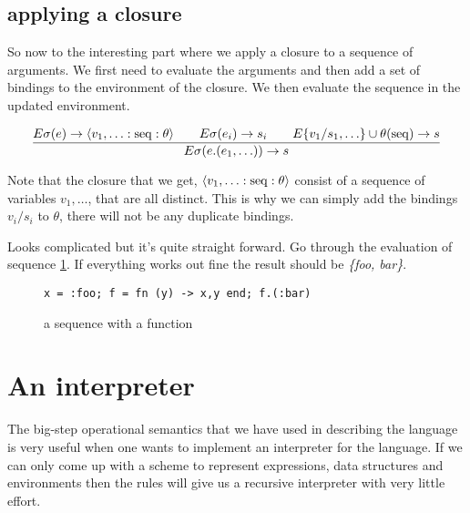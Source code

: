 \documentclass[a4paper,11pt]{article}
\begin{document}
\subsection{applying a closure}

So now to the interesting part where we apply a closure to a sequence
of arguments. We first need to evaluate the arguments and then add a
set of bindings to the environment of the closure. We then evaluate
the sequence in the updated environment.

$$\frac{E\sigma(e) \rightarrow \langle v_1, \ldots:{\rm seq}:\theta \rangle \qquad E\sigma(e_i) \rightarrow s_i \qquad E\{v_1/s_1, \ldots\}\cup\theta({\rm seq}) \rightarrow s}{E\sigma(e.(e_1, \ldots)) \rightarrow s}$$ 

Note that the closure that we get, $\langle v_1, \ldots:{\rm seq}:\theta \rangle$
consist of a sequence of variables $v_1, \ldots$, that are all
distinct. This is why we can simply add the bindings $v_i/s_i$ to
$\theta$, there will not be any duplicate bindings.

Looks complicated but it's quite straight forward. Go through the
evaluation of sequence \ref{fig:seq2}. If everything works out fine
the result should be {\em \{foo, bar\}}.

\begin{figure}[ht]
\center
{\tt x = :foo; f = fn (y) -> {x,y} end;  f.(:bar)}
\caption{a sequence with a function}
\label{fig:seq2}
\end{figure}

\section{An interpreter}

The big-step operational semantics that we have used in describing the
language is very useful when one wants to implement an interpreter
for the language. If we can only come up with a scheme to represent
expressions, data structures and environments then the rules will give
us a recursive interpreter with very little effort.
\end{document}

